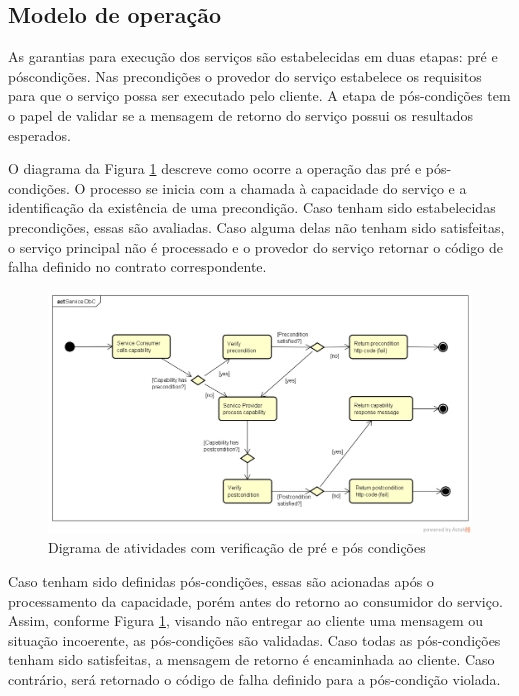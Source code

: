 \vspace{-6mm}

\subsection{Modelo de operação}
\vspace{-6mm}

As garantias para execução dos serviços são estabelecidas em duas etapas: pré e
póscondições. Nas precondições o provedor do serviço estabelece os requisitos
para que o serviço possa ser executado pelo cliente. A etapa de pós-condições
tem o papel de validar se a mensagem de retorno do serviço possui os resultados
esperados.

O diagrama da Figura \ref{FigServiceDbC} descreve como ocorre a operação das
pré e pós-condições. O processo se inicia com a chamada à capacidade do serviço e a
identificação da existência de uma precondição. Caso tenham sido estabelecidas 
precondições, essas são avaliadas. Caso alguma delas não tenham sido
satisfeitas, o serviço principal não é processado e o provedor do serviço
retornar o código de falha definido no contrato correspondente.


\begin{figure}[!htb]
\centering
\includegraphics[width=\textwidth,trim = 0mm 5mm 0mm 0mm,clip]{ServiceDbC.png}
\caption{Digrama de atividades com verificação de pré e pós condições}
\label{FigServiceDbC}
\end{figure}

Caso tenham sido definidas pós-condições, essas são acionadas após o
processamento da capacidade, porém antes do retorno ao consumidor do serviço.
Assim, conforme Figura \ref{FigServiceDbC}, visando não entregar ao cliente uma
mensagem ou situação incoerente, as pós-condições são validadas. Caso todas as
pós-condições tenham sido satisfeitas, a mensagem de retorno é encaminhada ao
cliente. Caso contrário, será retornado o código de falha definido para a
pós-condição violada.

